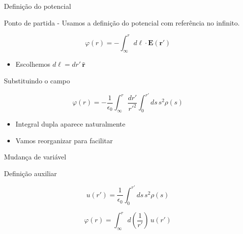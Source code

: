 \documentclass[aspectratio=169,11pt]{beamer}
\begin{document}
\begin{frame}{Definição do potencial}

\begin{mybox}{Ponto de partida - }
Usamos a definição do potencial com referência no infinito.
\end{mybox}

\begin{eqbox}
\begin{equation}
\varphi(r) = -\int_{\infty}^{r} d\boldsymbol{\ell}\cdot \mathbf{E}(\mathbf r')
\end{equation}
\end{eqbox}

\begin{itemize}
\item Escolhemos \(d\boldsymbol{\ell} = dr'\,\hat{\mathbf r}\)
\end{itemize}

\end{frame}

\begin{frame}{Substituindo o campo}

\begin{eqbox}
\begin{equation}
\varphi(r)
=
-\frac{1}{\epsilon_0}
\int_{\infty}^{r}
\frac{dr'}{r'^2}
\int_0^{r'} ds\, s^2 \rho(s)
\end{equation}
\end{eqbox}

\begin{itemize}
\item Integral dupla aparece naturalmente
\item Vamos reorganizar para facilitar
\end{itemize}

\end{frame}

\begin{frame}{Mudança de variável}

\begin{mybox}{Definição auxiliar}
\end{mybox}

\begin{eqbox}
\begin{equation}
u(r') =
\frac{1}{\epsilon_0}
\int_0^{r'} ds\, s^2 \rho(s)
\end{equation}
\end{eqbox}

\begin{eqbox}
\begin{equation}
\varphi(r)
=
\int_{\infty}^{r}
d\left(\frac{1}{r'}\right)\, u(r')
\end{equation}
\end{eqbox}

\end{frame}
\end{document}
